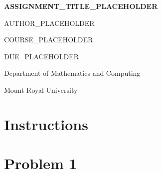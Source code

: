 \documentclass[11pt]{article}
\begin{document}
	\begin{titlepage}
	    \centering
	    \vspace*{1cm} %
	
	    {\Large\bfseries ASSIGNMENT_TITLE_PLACEHOLDER\par}
	    \vspace{1.5cm} %
	    {\large AUTHOR_PLACEHOLDER\par}
	    \vspace{1cm} %
	    {\large COURSE_PLACEHOLDER\par}
	    \vspace{0.5cm} %
	    {\large DUE_PLACEHOLDER\par}
	
	    \vfill
	
	    \vfill %
	    {\large Department of Mathematics and Computing\par}
	    {\large Mount Royal University\par}
	\end{titlepage}

  \section*{Instructions}

  \section{Problem 1}
\end{document}
